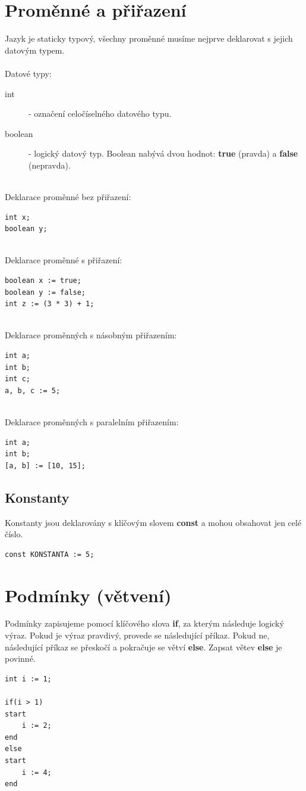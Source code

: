\documentclass[12pt]{report}
\begin{document}
\section{Proměnné a přiřazení}
Jazyk je staticky typový, všechny proměnné musíme nejprve deklarovat s jejich datovým typem.\\
\\
Datové typy:
\begin{description}
	\item [int] - označení celočíselného datového typu.
	\item [boolean] - logický datový typ. Boolean nabývá dvou hodnot: \textbf{true} (pravda) a \textbf{false} (nepravda). 
\end{description}
\ \\
Deklarace proměnné bez přiřazení:
\begin{verbatim}
int x;
boolean y;
\end{verbatim}
\ \\
Deklarace proměnné s přiřazení:
\begin{verbatim}
boolean x := true;
boolean y := false;
int z := (3 * 3) + 1;
\end{verbatim}
\ \\
Deklarace proměnných s násobným přiřazením:
\begin{verbatim}
int a;
int b;
int c;
a, b, c := 5;
\end{verbatim}
\ \\
Deklarace proměnných s paralelním přiřazením:
\begin{verbatim}
int a;
int b;
[a, b] := [10, 15];
\end{verbatim}





\subsection{Konstanty}
Konstanty jsou deklarovány s klíčovým slovem \textbf{const} a mohou obsahovat jen celé číslo.
\begin{verbatim}
const KONSTANTA := 5;
\end{verbatim}






\section{Podmínky (větvení)}
Podmínky zapisujeme pomocí klíčového slova \textbf{if}, za kterým následuje logický výraz. Pokud je výraz pravdivý, provede se následující příkaz. Pokud ne, následující příkaz se přeskočí a pokračuje se větví \textbf{else}. Zapsat větev \textbf{else} je povinné.
\begin{verbatim}
int i := 1;

if(i > 1)
start
    i := 2;
end
else
start
    i := 4;
end
\end{verbatim}
\end{document}
